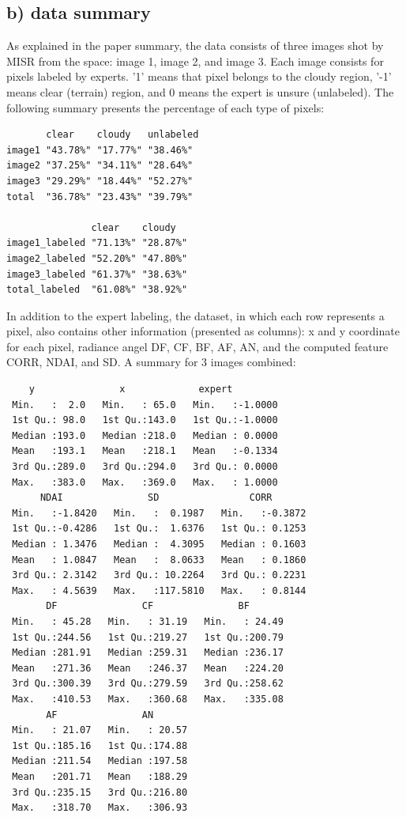 \documentclass[jou]{apa}%
\begin{document}
\subsection{b) data summary}
As explained in the paper summary, the data consists of three images shot by MISR from the space: image 1, image 2, and image 3. Each image consists for pixels labeled by experts. '1' means that pixel belongs to the cloudy region, '-1' means clear (terrain) region, and 0 means the expert is unsure (unlabeled). The following summary presents the percentage of each type of pixels: 
\begin{verbatim}
       clear    cloudy   unlabeled
image1 "43.78%" "17.77%" "38.46%" 
image2 "37.25%" "34.11%" "28.64%" 
image3 "29.29%" "18.44%" "52.27%" 
total  "36.78%" "23.43%" "39.79%" 

               clear    cloudy  
image1_labeled "71.13%" "28.87%"
image2_labeled "52.20%" "47.80%"
image3_labeled "61.37%" "38.63%"
total_labeled  "61.08%" "38.92%"
\end{verbatim}
In addition to the expert labeling, the dataset, in which each row represents a pixel, also contains other information (presented as columns): x and y coordinate for each pixel, radiance angel DF, CF, BF, AF, AN, and the computed feature CORR, NDAI, and SD. A summary for 3 images combined:
\begin{verbatim}
    y               x             expert       
 Min.   :  2.0   Min.   : 65.0   Min.   :-1.0000  
 1st Qu.: 98.0   1st Qu.:143.0   1st Qu.:-1.0000  
 Median :193.0   Median :218.0   Median : 0.0000  
 Mean   :193.1   Mean   :218.1   Mean   :-0.1334  
 3rd Qu.:289.0   3rd Qu.:294.0   3rd Qu.: 0.0000  
 Max.   :383.0   Max.   :369.0   Max.   : 1.0000  
      NDAI               SD                CORR        
 Min.   :-1.8420   Min.   :  0.1987   Min.   :-0.3872  
 1st Qu.:-0.4286   1st Qu.:  1.6376   1st Qu.: 0.1253  
 Median : 1.3476   Median :  4.3095   Median : 0.1603  
 Mean   : 1.0847   Mean   :  8.0633   Mean   : 0.1860  
 3rd Qu.: 2.3142   3rd Qu.: 10.2264   3rd Qu.: 0.2231  
 Max.   : 4.5639   Max.   :117.5810   Max.   : 0.8144  
       DF               CF               BF        
 Min.   : 45.28   Min.   : 31.19   Min.   : 24.49  
 1st Qu.:244.56   1st Qu.:219.27   1st Qu.:200.79  
 Median :281.91   Median :259.31   Median :236.17  
 Mean   :271.36   Mean   :246.37   Mean   :224.20  
 3rd Qu.:300.39   3rd Qu.:279.59   3rd Qu.:258.62  
 Max.   :410.53   Max.   :360.68   Max.   :335.08  
       AF               AN        
 Min.   : 21.07   Min.   : 20.57  
 1st Qu.:185.16   1st Qu.:174.88  
 Median :211.54   Median :197.58  
 Mean   :201.71   Mean   :188.29  
 3rd Qu.:235.15   3rd Qu.:216.80  
 Max.   :318.70   Max.   :306.93  
\end{verbatim}
\end{document}
